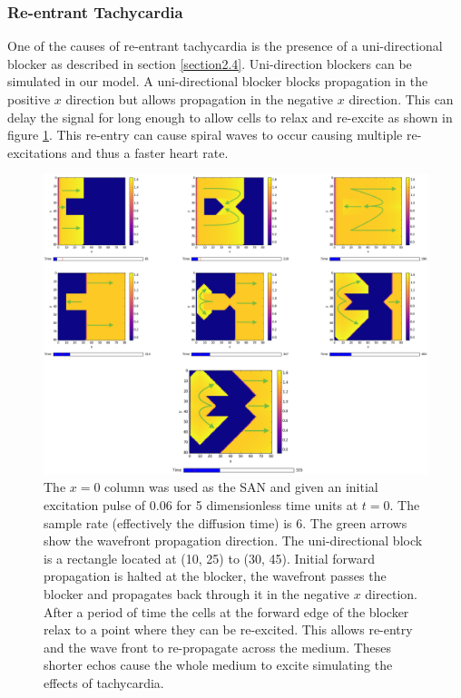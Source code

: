     \subsubsection{Re-entrant Tachycardia}
    One of the causes of re-entrant tachycardia is the presence of a uni-directional blocker as described in section \ref{section2.4}. Uni-direction blockers can be simulated in our model. A uni-directional blocker blocks propagation in the positive $x$ direction but allows propagation in the negative $x$ direction. This can delay the signal for long enough to allow cells to relax and re-excite as shown in figure \ref{fig5.3.1a}. This re-entry can cause spiral waves to occur causing multiple re-excitations and thus a faster heart rate. \par
    \begin{figure}[H]
        \centering
        \includegraphics[width=\textwidth]{images/uniblocker.png}
        \caption{The $x=0$ column was used as the SAN and given an initial excitation pulse of 0.06 for 5 dimensionless time units at $t=0$. The sample rate (effectively the diffusion time) is 6. The green arrows show the wavefront propagation direction. The uni-directional block is a rectangle located at (10, 25) to (30, 45). Initial forward propagation is halted at the blocker, the wavefront passes the blocker and propagates back through it in the negative $x$ direction. After a period of time the cells at the forward edge of the blocker relax to a point where they can be re-excited. This allows re-entry and the wave front to re-propagate across the medium. Theses shorter echos cause the whole medium to excite simulating the effects of tachycardia.}
        \label{fig5.3.1a}
    \end{figure}
    
